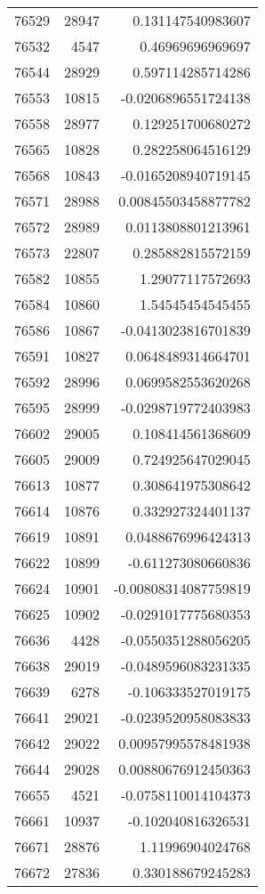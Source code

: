 \begin{tabular}{r | r | r}
76529 & 28947 & 0.131147540983607 \\
76532 & 4547 & 0.46969696969697 \\
76544 & 28929 & 0.597114285714286 \\
76553 & 10815 & -0.0206896551724138 \\
76558 & 28977 & 0.129251700680272 \\
76565 & 10828 & 0.282258064516129 \\
76568 & 10843 & -0.0165208940719145 \\
76571 & 28988 & 0.00845503458877782 \\
76572 & 28989 & 0.0113808801213961 \\
76573 & 22807 & 0.285882815572159 \\
76582 & 10855 & 1.29077117572693 \\
76584 & 10860 & 1.54545454545455 \\
76586 & 10867 & -0.0413023816701839 \\
76591 & 10827 & 0.0648489314664701 \\
76592 & 28996 & 0.0699582553620268 \\
76595 & 28999 & -0.0298719772403983 \\
76602 & 29005 & 0.108414561368609 \\
76605 & 29009 & 0.724925647029045 \\
76613 & 10877 & 0.308641975308642 \\
76614 & 10876 & 0.332927324401137 \\
76619 & 10891 & 0.0488676996424313 \\
76622 & 10899 & -0.611273080660836 \\
76624 & 10901 & -0.00808314087759819 \\
76625 & 10902 & -0.0291017775680353 \\
76636 & 4428 & -0.0550351288056205 \\
76638 & 29019 & -0.0489596083231335 \\
76639 & 6278 & -0.106333527019175 \\
76641 & 29021 & -0.0239520958083833 \\
76642 & 29022 & 0.00957995578481938 \\
76644 & 29028 & 0.00880676912450363 \\
76655 & 4521 & -0.0758110014104373 \\
76661 & 10937 & -0.102040816326531 \\
76671 & 28876 & 1.11996904024768 \\
76672 & 27836 & 0.330188679245283 \\

\end{tabular}

